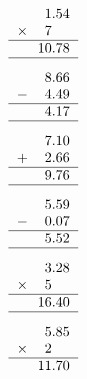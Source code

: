 \documentclass[leqno, 12pt]{article}
\begin{document}
\begin{multicols}{3}
\begin{equation}
    \raisebox{-0.8cm}{
        \begin{tabular}{c S[table-format=1.2]}
         &1.54 \tabularnewline
        $\times$&7 \tabularnewline
        \hline
         &10.78 \tabularnewline
        \hline
    \end{tabular}}
\end{equation}
\vspace{-1pt}%
\begin{equation}
    \raisebox{-0.8cm}{
        \begin{tabular}{c S[table-format=1.2]}
         &8.66 \tabularnewline
        $-$&4.49 \tabularnewline
        \hline
         &4.17 \tabularnewline
        \hline
    \end{tabular}}
\end{equation}
\vspace{-1pt}%
\begin{equation}
    \raisebox{-0.8cm}{
        \begin{tabular}{c S[table-format=1.2]}
         &7.10 \tabularnewline
        $+$&2.66 \tabularnewline
        \hline
         &9.76 \tabularnewline
        \hline
    \end{tabular}}
\end{equation}
\vspace{-1pt}%
\begin{equation}
    \raisebox{-0.8cm}{
        \begin{tabular}{c S[table-format=1.2]}
         &5.59 \tabularnewline
        $-$&0.07 \tabularnewline
        \hline
         &5.52 \tabularnewline
        \hline
    \end{tabular}}
\end{equation}
\vspace{-1pt}%
\begin{equation}
    \raisebox{-0.8cm}{
        \begin{tabular}{c S[table-format=1.2]}
         &3.28 \tabularnewline
        $\times$&5 \tabularnewline
        \hline
         &16.40 \tabularnewline
        \hline
    \end{tabular}}
\end{equation}
\vspace{-1pt}%
\begin{equation}
    \raisebox{-0.8cm}{
        \begin{tabular}{c S[table-format=1.2]}
         &5.85 \tabularnewline
        $\times$&2 \tabularnewline
        \hline
         &11.70 \tabularnewline

\end{tabular}}
\end{equation}
\end{multicols}
\end{document}
